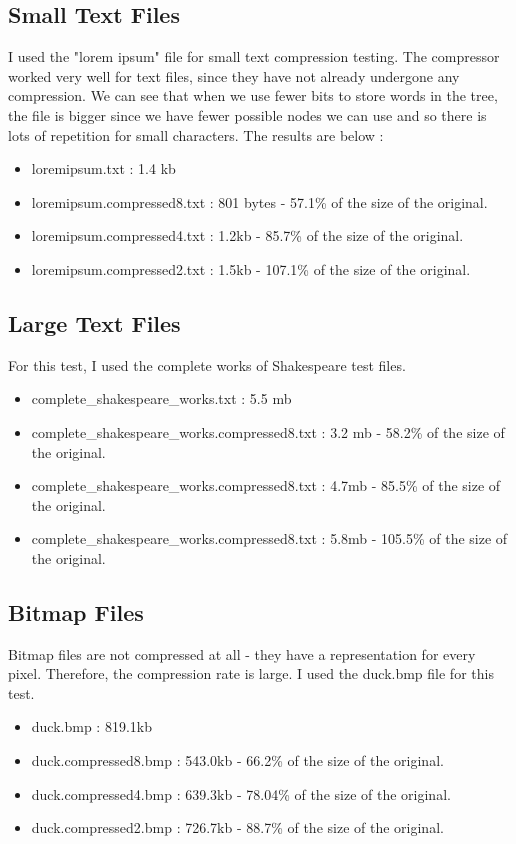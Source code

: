 \documentclass[12pt, letterpaper]{article}
\begin{document}
\subsection{Small Text Files}
I used the "lorem ipsum" file for small text compression testing. The compressor worked very well for text files, since they have not already undergone any compression. We can see that when we use fewer bits to store words in the tree, the file is bigger since we have fewer possible nodes we can use and so there is lots of repetition for small characters. The results are below :
\begin{itemize}
  \item loremipsum.txt : 1.4 kb
  \item loremipsum.compressed8.txt :  801 bytes - 57.1\% of the size of the original.
  \item loremipsum.compressed4.txt : 1.2kb - 85.7\% of the size of the original.
  \item loremipsum.compressed2.txt : 1.5kb - 107.1\% of the size of the original.
\end{itemize}
\subsection{Large Text Files}
For this test, I used the complete works of Shakespeare test files.
\begin{itemize}
  \item complete\_shakespeare\_works.txt : 5.5 mb
  \item complete\_shakespeare\_works.compressed8.txt :  3.2 mb - 58.2\% of the size of the original.
  \item complete\_shakespeare\_works.compressed8.txt : 4.7mb - 85.5\% of the size of the original.
  \item complete\_shakespeare\_works.compressed8.txt : 5.8mb - 105.5\% of the size of the original.
\end{itemize}
\subsection{Bitmap Files}
Bitmap files are not compressed at all - they have a representation for every pixel. Therefore, the compression rate is large. I used the duck.bmp file for this test.
\begin{itemize}
  \item duck.bmp : 819.1kb 
  \item duck.compressed8.bmp :  543.0kb - 66.2\% of the size of the original.
  \item duck.compressed4.bmp : 639.3kb - 78.04\% of the size of the original.
  \item duck.compressed2.bmp : 726.7kb - 88.7\% of the size of the original.
\end{itemize}
\end{document}
